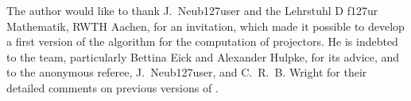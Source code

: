 The author would like to thank J.~Neub\accent127user and the Lehrstuhl D f\accent127ur
Mathematik, RWTH Aachen, for an invitation, which made it possible to develop a first
version of the algorithm for the computation of projectors. He is indebted to the {\GAP}
team, particularly Bettina Eick and Alexander Hulpke, for its advice, and to the
anonymous referee, J.~Neub\accent127user, and C.~R.~B. Wright for their detailed comments
on previous versions of {\CRISP}.



